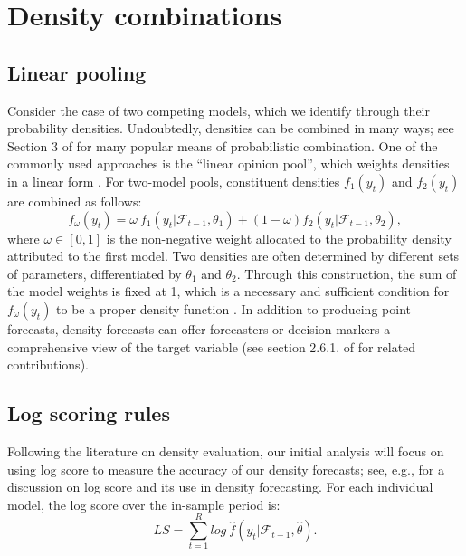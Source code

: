 \documentclass{monashthesis}
\begin{document}
\hypertarget{density-combinations}{%
\section{Density combinations}\label{density-combinations}}

\subsection*{Linear pooling}

Consider the case of two competing models, which we identify through their probability densities. Undoubtedly, densities can be combined in many ways; see Section 3 of \textcite{WHLK22} for many popular means of probabilistic combination. One of the commonly used approaches is the ``linear opinion pool'', which weights densities in a linear form \autocites[e.g.,][]{BG69,HM07,GA11}. For two-model pools, constituent densities \(f_1(y_t)\) and \(f_2(y_t)\) are combined as follows:
\begin{equation*}
f_{\omega}(y_t) = \omega \ f_1(y_t | \mathcal{F}_{t-1}, \theta_{1}) + (1-\omega) f_2(y_t | \mathcal{F}_{t-1}, \theta_{2}),
\end{equation*}
where \(\omega \in [0,1]\) is the non-negative weight allocated to the probability density attributed to the first model. Two densities are often determined by different sets of parameters, differentiated by \(\theta_{1}\) and \(\theta_{2}\). Through this construction, the sum of the model weights is fixed at 1, which is a necessary and sufficient condition for \(f_{\omega}(y_t)\) to be a proper density function \autocite{GA11}. In addition to producing point forecasts, density forecasts can offer forecasters or decision markers a comprehensive view of the target variable (see section 2.6.1. of \textcite{FTP22} for related contributions).

\subsection*{Log scoring rules}

Following the literature on density evaluation, our initial analysis will focus on using log score to measure the accuracy of our density forecasts; see, e.g., \textcite{GA11} for a discussion on log score and its use in density forecasting. For each individual model, the log score over the in-sample period is:\\
\begin{equation*}
LS = \sum^R_{t=1} log \ \hat f(y_t| \mathcal{F}_{t-1}, \hat\theta).
\end{equation*}
\end{document}
